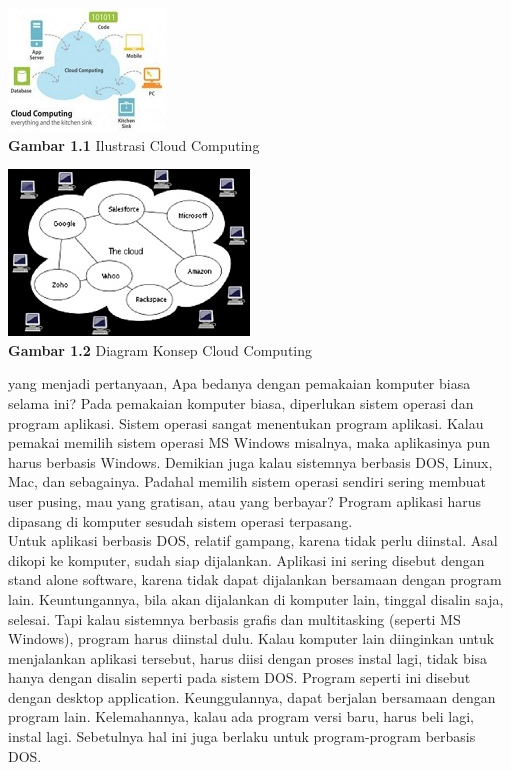 \begin{center}
\includegraphics[scale=1]{saatu.jpg} \\
\textbf{Gambar 1.1} Ilustrasi Cloud Computing
\end{center}
\begin{center}
\includegraphics[scale=1]{sdua.jpg} \\
\textbf{Gambar 1.2} Diagram Konsep Cloud Computing
\end{center}
\tab yang menjadi pertanyaan, Apa bedanya dengan pemakaian komputer biasa selama ini? Pada pemakaian komputer biasa, diperlukan sistem operasi dan program aplikasi. Sistem operasi sangat menentukan program aplikasi. Kalau pemakai memilih sistem operasi MS Windows misalnya, maka aplikasinya pun harus berbasis Windows. Demikian juga kalau sistemnya berbasis DOS, Linux, Mac, dan sebagainya. Padahal memilih sistem operasi sendiri sering membuat user pusing, mau yang gratisan, atau yang berbayar? Program aplikasi harus dipasang di komputer sesudah sistem operasi terpasang. \\Untuk aplikasi berbasis DOS, relatif gampang, karena tidak perlu diinstal. Asal dikopi ke komputer, sudah siap dijalankan. Aplikasi ini sering disebut dengan stand alone software, karena tidak dapat dijalankan bersamaan dengan program lain. Keuntungannya, bila akan dijalankan di komputer lain, tinggal disalin saja, selesai. Tapi kalau sistemnya berbasis grafis dan multitasking (seperti MS Windows), program harus diinstal dulu. Kalau komputer lain diinginkan untuk menjalankan aplikasi tersebut, harus diisi dengan proses instal lagi, tidak bisa hanya dengan disalin seperti pada sistem DOS. Program seperti ini disebut dengan desktop application. Keunggulannya, dapat berjalan bersamaan dengan program lain. Kelemahannya, kalau ada program versi baru, harus beli lagi, instal lagi. Sebetulnya hal ini juga berlaku untuk program-program berbasis DOS.

